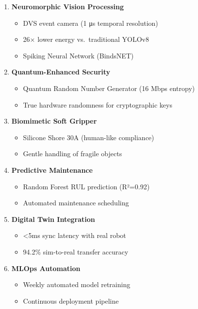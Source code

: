 \documentclass[
]{article}
\providecommand{\tightlist}{%
  \setlength{\itemsep}{0pt}\setlength{\parskip}{0pt}}
\begin{document}
\begin{enumerate}
\def\labelenumi{\arabic{enumi}.}
\tightlist
\item
  \textbf{Neuromorphic Vision Processing}

  \begin{itemize}
  \tightlist
  \item
    DVS event camera (1 μs temporal resolution)
  \item
    26× lower energy vs.~traditional YOLOv8
  \item
    Spiking Neural Network (BindsNET)
  \end{itemize}
\item
  \textbf{Quantum-Enhanced Security}

  \begin{itemize}
  \tightlist
  \item
    Quantum Random Number Generator (16 Mbps entropy)
  \item
    True hardware randomness for cryptographic keys
  \end{itemize}
\item
  \textbf{Biomimetic Soft Gripper}

  \begin{itemize}
  \tightlist
  \item
    Silicone Shore 30A (human-like compliance)
  \item
    Gentle handling of fragile objects
  \end{itemize}
\item
  \textbf{Predictive Maintenance}

  \begin{itemize}
  \tightlist
  \item
    Random Forest RUL prediction (R²=0.92)
  \item
    Automated maintenance scheduling
  \end{itemize}
\item
  \textbf{Digital Twin Integration}

  \begin{itemize}
  \tightlist
  \item
    \textless5ms sync latency with real robot
  \item
    94.2\% sim-to-real transfer accuracy
  \end{itemize}
\item
  \textbf{MLOps Automation}

  \begin{itemize}
  \tightlist
  \item
    Weekly automated model retraining
  \item
    Continuous deployment pipeline
  \end{itemize}
\end{enumerate}
\end{document}
